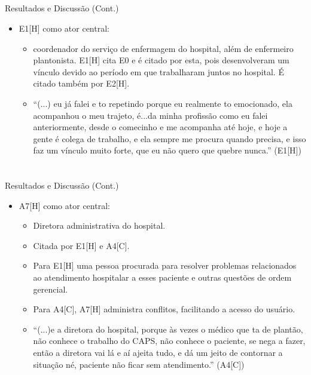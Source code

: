 \documentclass[10pt]{beamer}
\begin{document}
\subsection{}
\begin{frame}{Resultados e Discussão (Cont.)}{}
  \begin{itemize}
    \item E1[H] como ator central: 
    \begin{itemize}
    	\item coordenador do serviço de enfermagem do hospital, além de enfermeiro plantonista. E1[H] cita E0 e é citado por esta, pois desenvolveram um vínculo devido ao período em que trabalharam juntos no hospital. É citado também por E2[H].
	\item ``(...) eu já falei e to repetindo porque eu realmente to emocionado, ela acompanhou o meu trajeto, é...da minha profissão como eu falei anteriormente, desde o comecinho e me acompanha até hoje, e hoje a gente é colega de trabalho, e ela sempre me procura quando precisa, e isso faz um vínculo muito forte, que eu não quero que quebre nunca.'' (E1[H])
    \end{itemize}
  \end{itemize}
\end{frame}

\section{}
\subsection{}
\begin{frame}{Resultados e Discussão (Cont.)}{}
  \begin{itemize}
    \item A7[H] como ator central:
    \begin{itemize}
    	\item Diretora administrativa do hospital.
    	\item Citada por E1[H] e A4[C].
    	\item Para E1[H] uma pessoa procurada para resolver problemas relacionados ao atendimento hospitalar a esses paciente e outras questões de ordem gerencial.
    	\item Para A4[C], A7[H] administra conflitos, facilitando a acesso do usuário.
	\item ``(...)e a diretora do hospital, porque às vezes o médico que ta de plantão, não conhece o trabalho do CAPS, não conhece o paciente, se nega a fazer, então a diretora vai lá e aí ajeita tudo, e dá um jeito de contornar a situação né, paciente não ficar sem atendimento.'' (A4[C])
    \end{itemize}
  \end{itemize}
\end{frame}
\end{document}
